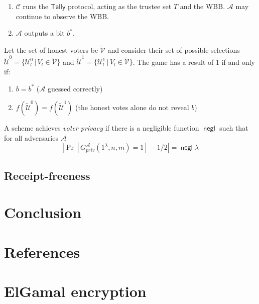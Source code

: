 \documentclass[11pt,twoside,a4paper]{article}
\DeclareMathOperator{\negl}{\mathsf{negl}}
\theoremstyle{definition}
\begin{document}
\begin{definition}
\begin{enumerate}
\begin{itemize}
        \end{itemize}
        \item $\mathcal{C}$ runs the $\mathsf{Tally}$ protocol, acting as the trustee set $T$ and the WBB. $\mathcal{A}$ may continue to observe the WBB.
        \item $\mathcal{A}$ outputs a bit $b^*$.
    \end{enumerate}
    Let the set of honest voters be $\tilde{\mathcal{V}}$ and consider their set of possible selections $\tilde{\mathcal{U}}^0=\{\mathcal{U}_l^0\,\vert\,V_l\in\tilde{\mathcal{V}}\}$ and $\tilde{\mathcal{U}}^1=\{\mathcal{U}_l^1\,\vert\,V_l\in\tilde{\mathcal{V}}\}$. The game has a result of 1 if and only if:
    \begin{enumerate}
        \item $b=b^*$ ($\mathcal{A}$ guessed correctly)
        \item $f\left(\tilde{\mathcal{U}}^0\right) = f\left(\tilde{\mathcal{U}}^1\right)$ (the honest votes alone do not reveal $b$)
    \end{enumerate}
    A scheme achieves \textit{voter privacy} if there is a negligible function $\negl$ such that for all adversaries $\mathcal{A}$
    $$\left|\Pr\left[G^\mathcal{A}_\mathit{priv}(1^\lambda, n, m)=1\right]-1/2\right|=\negl{\lambda}$$
\end{definition}

\subsection{Receipt-freeness}
\section{Conclusion}
\newpage
\section{References}


\newpage
\appendix
\section{ElGamal encryption}\label{app-elgamal}
\end{document}

